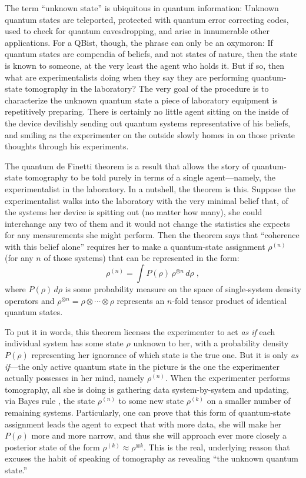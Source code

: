 \documentclass[aps,pra,superscriptaddress,10pt,tightenlines,twocolumn,nofootinbib]{revtex4}
\begin{document}
The term ``unknown state'' is ubiquitous in quantum information:  Unknown quantum states are teleported, protected with quantum error correcting codes, used to check for quantum eavesdropping, and arise in innumerable other applications.  For a QBist, though, the phrase can only be an oxymoron:  If quantum states are compendia of beliefs, and not states of nature, then the state is known to someone, at the very least the agent who holds it.  But if so, then what are experimentalists doing when they say they are performing quantum-state tomography in the laboratory?  The very goal of the procedure is to characterize the unknown quantum state a piece of laboratory equipment is repetitively preparing. There is certainly no little agent sitting on the inside of the device devilishly sending out quantum systems representative of his beliefs, and smiling as the experimenter on the outside slowly homes in on those private thoughts through his experiments.

The quantum de Finetti theorem is a result that allows the story of quantum-state tomography to be told purely in terms of a single agent---namely, the experimentalist in the laboratory.  In a nutshell, the theorem is this.  Suppose the experimentalist walks into the laboratory with the very minimal belief that, of the systems her device is spitting out (no matter how many), she could interchange any two of them and it would not change the statistics she expects for any measurements she might perform.  Then the theorem says that ``coherence with this belief alone'' requires her to make a quantum-state assignment $\rho^{(n)}$ (for any $n$ of those systems) that can be represented in the form:
\begin{equation}
\rho^{(n)}=\int P(\rho)\, \rho^{\otimes n}\, d\rho\;,
\label{MushuPork}
\end{equation}
where $P(\rho)\, d\rho$ is some probability measure on the space of single-system density operators and $\rho^{\otimes n}=\rho\otimes\cdots\otimes\rho$ represents an $n$-fold tensor product of identical quantum states.

To put it in words, this theorem licenses the experimenter to act {\it as if\/} each individual system has some state $\rho$ unknown to her, with a probability density $P(\rho)$ representing her ignorance of which state is the true one.  But it is only {\it as if}---the only active quantum state in the picture is the one the experimenter actually possesses in her mind, namely $\rho^{(n)}$.  When the experimenter performs tomography, all she is doing is gathering data system-by-system and updating, via Bayes rule \cite{Schack01}, the state $\rho^{(n)}$ to some new state $\rho^{(k)}$ on a smaller number of remaining systems. Particularly, one can prove that this form of quantum-state assignment leads the agent to expect that with more data, she will make her $P(\rho)$ more and more narrow, and thus she will approach ever more closely a posterior state of the form $\rho^{(k)}\approx \rho^{\otimes k}$.  This is the real, underlying reason that excuses the habit of speaking of tomography as revealing ``the unknown quantum state.''
\end{document}
